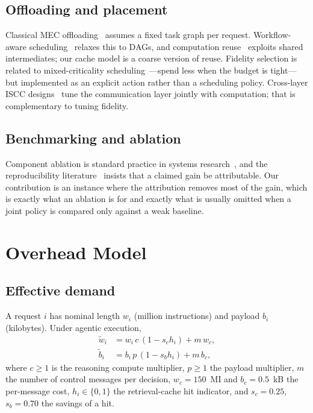 \documentclass[journal,10pt]{IEEEtran}
\begin{document}
\subsection{Offloading and placement}
Classical MEC offloading~\cite{mao2017survey,mach2017survey,chen2015game}
assumes a fixed task graph per request. Workflow-aware
scheduling~\cite{he2026workflow} relaxes this to DAGs, and computation
reuse~\cite{he2026reuse} exploits shared intermediates; our cache model is a
coarse version of reuse. Fidelity selection is related to mixed-criticality
scheduling~\cite{liu1973scheduling,zakerian2026llm}---spend less when the budget
is tight---but implemented as an explicit action rather than a scheduling
policy. Cross-layer ISCC designs~\cite{liu2026iscc,li2026semantic} tune the
communication layer jointly with computation; that is complementary to tuning
fidelity.

\subsection{Benchmarking and ablation}
Component ablation is standard practice in systems
research~\cite{hoefler2015benchmarking}, and the reproducibility
literature~\cite{collberg2016repeatability,peng2011reproducible} insists that a
claimed gain be attributable. Our contribution is an instance where the
attribution removes most of the gain, which is exactly what an ablation is for
and exactly what is usually omitted when a joint policy is compared only against
a weak baseline.

\section{Overhead Model}
\label{sec:model}

\subsection{Effective demand}
A request $i$ has nominal length $w_i$ (million instructions) and payload $b_i$
(kilobytes). Under agentic execution,
\begin{align}
\tilde w_i &= w_i\,c\,(1-s_c h_i) + m\,w_c, \label{eq:compute}\\
\tilde b_i &= b_i\,p\,(1-s_b h_i) + m\,b_c, \label{eq:payload}
\end{align}
where $c\ge1$ is the reasoning compute multiplier, $p\ge1$ the payload
multiplier, $m$ the number of control messages per decision, $w_c=150$~MI and
$b_c=0.5$~kB the per-message cost, $h_i\in\{0,1\}$ the retrieval-cache hit
indicator, and $s_c=0.25$, $s_b=0.70$ the savings of a hit.
\end{document}
